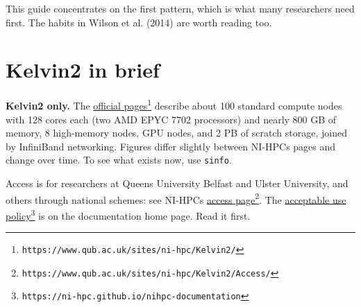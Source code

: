 This guide concentrates on the first pattern, which is what many researchers need first. The habits in Wilson et al. (2014) are worth reading too.

\section{Kelvin2 in brief}\label{kelvin2-in-brief}

\textbf{Kelvin2 only.} The \href{https://www.qub.ac.uk/sites/ni-hpc/Kelvin2/}{official pages}\footnote{\texttt{https://www.qub.ac.uk/sites/ni-hpc/Kelvin2/}} describe about 100 standard compute nodes with 128 cores each (two AMD EPYC 7702 processors) and nearly 800 GB of memory, 8 high-memory nodes, GPU nodes, and 2 PB of scratch storage, joined by InfiniBand networking. Figures differ slightly between NI-HPC\textquotesingle s pages and change over time. To see what exists now, use \texttt{sinfo}.

Access is for researchers at Queen\textquotesingle s University Belfast and Ulster University, and others through national schemes: see NI-HPC\textquotesingle s \href{https://www.qub.ac.uk/sites/ni-hpc/Kelvin2/Access/}{access page}\footnote{\texttt{https://www.qub.ac.uk/sites/ni-hpc/Kelvin2/Access/}}. The \href{https://ni-hpc.github.io/nihpc-documentation}{acceptable use policy}\footnote{\texttt{https://ni-hpc.github.io/nihpc-documentation}} is on the documentation home page. Read it first.

